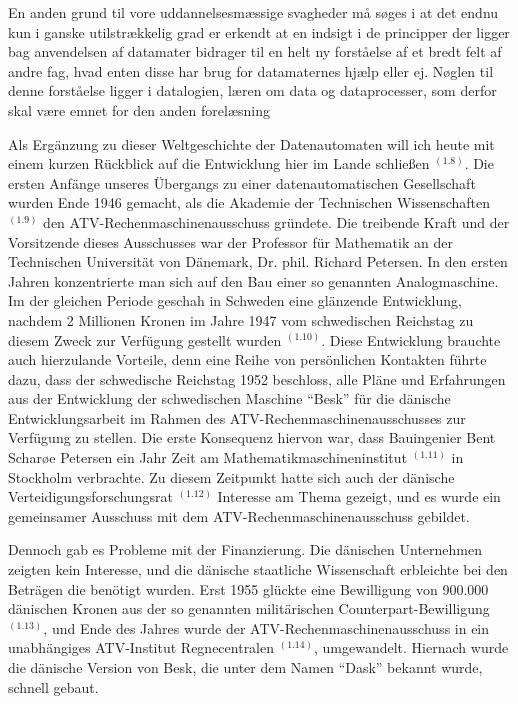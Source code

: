 {En anden grund til vore uddannelsesmæssige svagheder må søges i at det endnu kun i ganske utilstrækkelig grad er erkendt at en indsigt i de principper der ligger bag anvendelsen af datamater bidrager til en helt ny forståelse af et bredt felt af andre fag, hvad enten disse har brug for datamaternes hjælp eller ej. Nøglen til denne forståelse ligger i datalogien, læren om data og dataprocesser, som derfor skal være emnet for den anden forelæsning
}{
Als Ergänzung zu dieser Weltgeschichte der Datenautomaten will ich heute mit einem kurzen Rückblick auf die Entwicklung hier im Lande schließen $^{(1.8)}$. Die ersten Anfänge unseres Übergangs zu einer datenautomatischen Gesellschaft wurden Ende 1946 gemacht, als die Akademie der Technischen Wissenschaften $^{(1.9)}$ den ATV-Rechenmaschinenausschuss gründete. Die treibende Kraft und der Vorsitzende dieses Ausschusses war der Professor für Mathematik an der Technischen Universität von Dänemark, Dr. phil. Richard Petersen. In den ersten Jahren konzentrierte man sich auf den Bau einer so genannten Analogmaschine. Im der gleichen Periode geschah in Schweden eine glänzende Entwicklung, nachdem 2 Millionen Kronen im Jahre 1947 vom schwedischen Reichstag zu diesem Zweck zur Verfügung gestellt wurden $^{(1.10)}$. Diese Entwicklung brauchte auch hierzulande Vorteile, denn eine Reihe von persönlichen Kontakten führte dazu, dass der schwedische Reichstag 1952 beschloss, alle Pläne und Erfahrungen aus der Entwicklung der schwedischen Maschine \enquote{Besk} für die dänische Entwicklungsarbeit im Rahmen des ATV-Rechenmaschinenausschusses zur Verfügung zu stellen. Die erste Konsequenz hiervon war, dass Bauingenier Bent Scharøe Petersen ein Jahr Zeit am Mathematikmaschineninstitut $^{(1.11)}$ in Stockholm verbrachte. Zu diesem Zeitpunkt hatte sich auch der dänische Verteidigungsforschungsrat $^{(1.12)}$  Interesse am Thema gezeigt, und es wurde ein gemeinsamer Ausschuss mit dem ATV-Rechenmaschinenausschuss gebildet. 

Dennoch gab es Probleme mit der Finanzierung. Die dänischen Unternehmen zeigten kein Interesse, und die dänische staatliche Wissenschaft erbleichte bei den Beträgen die benötigt wurden. Erst 1955 glückte eine Bewilligung von 900.000 dänischen Kronen aus der so genannten militärischen Counterpart-Bewilligung $^{(1.13)}$, und Ende des Jahres wurde der ATV-Rechenmaschinenausschuss in ein unabhängiges ATV-Institut Regnecentralen $^{(1.14)}$, umgewandelt. Hiernach wurde die dänische Version von Besk, die unter dem Namen \enquote{Dask} bekannt wurde, schnell gebaut. 

}
